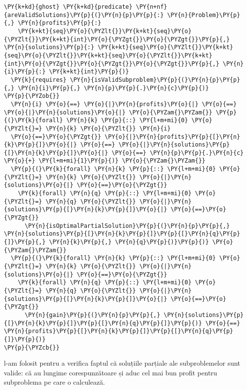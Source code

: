 \begin{sloppypar}
\begin{enumerate}
\begin{Verbatim}[commandchars=\\\{\}]
\PY{k+kd}{ghost} \PY{k+kd}{predicate} \PY{n+nf}{areValidSolutions}\PY{p}{(}\PY{n}{p}\PY{p}{:} \PY{n}{Problem}\PY{p}{,} \PY{n}{profits}\PY{p}{:} 
    \PY{k+kt}{seq}\PY{o}{\PYZlt{}}\PY{k+kt}{seq}\PY{o}{\PYZlt{}}\PY{k+kt}{int}\PY{o}{\PYZgt{}}\PY{o}{\PYZgt{}}\PY{p}{,} \PY{n}{solutions}\PY{p}{:} \PY{k+kt}{seq}\PY{o}{\PYZlt{}}\PY{k+kt}{seq}\PY{o}{\PYZlt{}}\PY{k+kt}{seq}\PY{o}{\PYZlt{}}\PY{k+kt}{int}\PY{o}{\PYZgt{}}\PY{o}{\PYZgt{}}\PY{o}{\PYZgt{}}\PY{p}{,} \PY{n}{i}\PY{p}{:} \PY{k+kt}{int}\PY{p}{)}
  \PY{k}{requires} \PY{n}{isValidSubproblem}\PY{p}{(}\PY{n}{p}\PY{p}{,} \PY{n}{i}\PY{p}{,} \PY{n}{p}\PY{p}{.}\PY{n}{c}\PY{p}{)}
\PY{p}{\PYZob{}} 
  \PY{n}{i} \PY{o}{==} \PY{o}{|}\PY{n}{profits}\PY{o}{|} \PY{o}{==} \PY{o}{|}\PY{n}{solutions}\PY{o}{|} \PY{o}{\PYZam{}\PYZam{}} \PY{p}{(}\PY{k}{forall} \PY{n}{k} \PY{p}{::} \PY{l+m+mi}{0} \PY{o}{\PYZlt{}=} \PY{n}{k} \PY{o}{\PYZlt{}} \PY{n}{i} 
  \PY{o}{==}\PY{o}{\PYZgt{}} \PY{o}{|}\PY{n}{profits}\PY{p}{[}\PY{n}{k}\PY{p}{]}\PY{o}{|} \PY{o}{==} \PY{o}{|}\PY{n}{solutions}\PY{p}{[}\PY{n}{k}\PY{p}{]}\PY{o}{|} \PY{o}{==} \PY{n}{p}\PY{p}{.}\PY{n}{c} \PY{o}{+} \PY{l+m+mi}{1}\PY{p}{)} \PY{o}{\PYZam{}\PYZam{}} 
  \PY{p}{(}\PY{k}{forall} \PY{n}{k} \PY{p}{::} \PY{l+m+mi}{0} \PY{o}{\PYZlt{}=} \PY{n}{k} \PY{o}{\PYZlt{}} \PY{o}{|}\PY{n}{solutions}\PY{o}{|} \PY{o}{==}\PY{o}{\PYZgt{}} 
    \PY{k}{forall} \PY{n}{q} \PY{p}{::} \PY{l+m+mi}{0} \PY{o}{\PYZlt{}=} \PY{n}{q} \PY{o}{\PYZlt{}} \PY{o}{|}\PY{n}{solutions}\PY{p}{[}\PY{n}{k}\PY{p}{]}\PY{o}{|} \PY{o}{==}\PY{o}{\PYZgt{}} 
      \PY{n}{isOptimalPartialSolution}\PY{p}{(}\PY{n}{p}\PY{p}{,} \PY{n}{solutions}\PY{p}{[}\PY{n}{k}\PY{p}{]}\PY{p}{[}\PY{n}{q}\PY{p}{]}\PY{p}{,} \PY{n}{k}\PY{p}{,} \PY{n}{q}\PY{p}{)}\PY{p}{)} \PY{o}{\PYZam{}\PYZam{}} 
  \PY{p}{(}\PY{k}{forall} \PY{n}{k} \PY{p}{::} \PY{l+m+mi}{0} \PY{o}{\PYZlt{}=} \PY{n}{k} \PY{o}{\PYZlt{}} \PY{o}{|}\PY{n}{solutions}\PY{o}{|} \PY{o}{==}\PY{o}{\PYZgt{}} 
    \PY{k}{forall} \PY{n}{q} \PY{p}{::} \PY{l+m+mi}{0} \PY{o}{\PYZlt{}=} \PY{n}{q} \PY{o}{\PYZlt{}} \PY{o}{|}\PY{n}{solutions}\PY{p}{[}\PY{n}{k}\PY{p}{]}\PY{o}{|} \PY{o}{==}\PY{o}{\PYZgt{}} 
      \PY{n}{gain}\PY{p}{(}\PY{n}{p}\PY{p}{,} \PY{n}{solutions}\PY{p}{[}\PY{n}{k}\PY{p}{]}\PY{p}{[}\PY{n}{q}\PY{p}{]}\PY{p}{)} \PY{o}{==} \PY{n}{profits}\PY{p}{[}\PY{n}{k}\PY{p}{]}\PY{p}{[}\PY{n}{q}\PY{p}{]}\PY{p}{)}
\PY{p}{\PYZcb{}}
\end{Verbatim}
    l-am folosit pentru a verifica faptul că soluțiile parțiale ale subproblemelor sunt valide: că au lungime corespunzătoare și aduc cel mai bun profit pentru subproblema pe care o calculează.
\end{enumerate}


\end{sloppypar}
